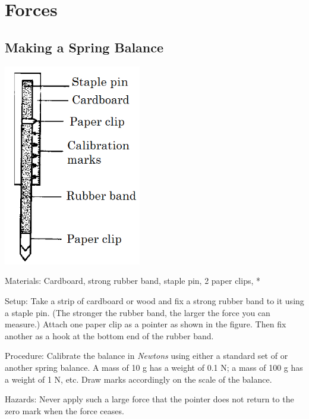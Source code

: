 \section{Forces}


\subsection{Making a Spring Balance} %

\begin{center}
\includegraphics[width=6cm]{./img/source/spring-balance.png}
\end{center}

\begin{description*}
\item[Materials:]{Cardboard, strong rubber band, staple pin, 2 paper clips, *}
\item[Setup:]{Take a strip of cardboard or wood and fix a strong rubber band to it using a staple pin. (The stronger the rubber band, the larger the force you can measure.) Attach one paper clip as a pointer as shown in the figure. Then fix another as a hook at the bottom end of the rubber band.}
\item[Procedure:]{Calibrate the balance in \emph{Newtons} using either a standard set of  or another spring balance. A mass of 10 g has a weight of 0.1 N; a mass of 100 g has a weight of 1 N, etc. Draw marks accordingly on the scale of the balance.}
\item[Hazards:]{Never apply such a large force that the pointer does not return to the zero mark when the force ceases.}
\end{description*}


